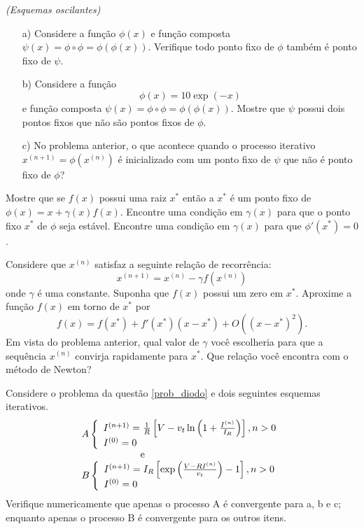 \documentclass[main.tex]{subfiles}
\begin{document}
\begin{Exercise}\it {(Esquemas oscilantes)}
\begin{itemize}
\item[a)] Considere a função $\phi(x)$ e função composta $\psi(x)=\phi\circ \phi=\phi\left(\phi(x)\right)$. Verifique todo ponto fixo de $\phi$ também é ponto fixo de $\psi$.

\item[b)]  Considere a função $$\phi(x)=10\exp(-x)$$ e função composta $\psi(x)=\phi\circ \phi=\phi\left(\phi(x)\right)$. Mostre que $\psi$ possui dois pontos fixos que não são pontos fixos de $\phi$.

\item[c)]  No problema anterior, o que acontece quando o processo iterativo $x^{(n+1)}=\phi(x^{(n)})$ é inicializado com um ponto fixo de $\psi$ que não é ponto fixo de $\phi$?
\end{itemize}
\end{Exercise}

\begin{Exercise}[title= Aceleração de convergência - introdução ao método de Newton]\label{int_new1} Mostre que se $f(x)$ possui uma raiz $x^*$ então a $x^*$ é um ponto fixo de $\phi(x)=x+\gamma(x) f(x)$. Encontre uma condição em $\gamma(x)$ para que o ponto fixo $x^*$ de $\phi$ seja estável. Encontre uma condição em $\gamma(x)$ para que $\phi'(x^*)=0$.
\end{Exercise}

\begin{Exercise}[title=Aceleração de convergência - introdução ao método de Newton]\label{int_new2} Considere que $x^{(n)}$ satisfaz a seguinte relação de recorrência:
$$x^{(n+1)}=x^{(n)} - \gamma f(x^{(n)})$$
onde $\gamma$ é uma constante. Suponha que $f(x)$ possui um zero em $x^*$. Aproxime a função $f(x)$ em torno de $x^*$ por
$$f(x)=f(x^*)+f'(x^*)(x-x^*)+O\left((x-x^*)^2\right).$$
Em vista do problema anterior, qual valor de $\gamma$ você escolheria para que a sequência $x^{(n)}$ convirja rapidamente para $x^*$. Que relação você encontra com o método de Newton?
\end{Exercise}

\begin{Exercise} Considere o problema da questão \ref{prob_diodo} e dois seguintes esquemas iterativos.
$$\begin{array}{l}
A\left\{
\begin{array}{ll}
I^{(n+1)}=\frac{1}{R}\left[V-v_t\ln\left(1+\frac{I^{(n)}}{I_R}\right)\right],n>0\\
I^{(0)}=0
\end{array}\right.\\ \hspace{2cm} \hbox{ e }\\
B\left\{
\begin{array}{ll}
I^{(n+1)}=I_R\left[\exp\left(\frac{V-RI^{(n)}}{v_t}\right)-1\right],n>0\\
I^{(0)}=0
\end{array}\right.
\end{array}
$$
Verifique numericamente que apenas o processo A é convergente para a, b e c; enquanto apenas o processo B é convergente para os outros itens.
\end{Exercise}
\end{document}
